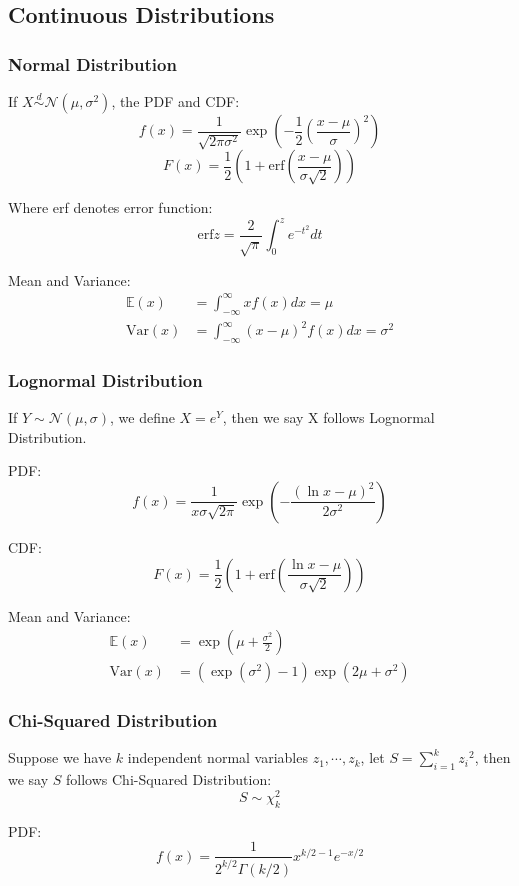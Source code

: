 \subsection{Continuous Distributions}

\subsubsection{Normal Distribution}
If $X \stackrel{d}{\sim} \mathcal{N}(\mu,\sigma^2)$, the PDF and CDF:
\[
f(x) = \frac{1}{\sqrt{2\pi \sigma^2}} \exp(-\frac{1}{2}(\frac{x-\mu}{\sigma})^2)
\]
\[
    F(x) = \frac{1}{2}(1+\mathrm{erf}(\frac{x-\mu}{\sigma \sqrt{2}}))
\]

Where erf denotes error function:
\[
    \mathrm{erf} z= \frac{2}{\sqrt{\pi}}\int_0^z e^{-t^2}dt 
\]

Mean and Variance:
\[
\begin{aligned}
    \mathbb{E}(x) &= \int_{-\infty}^{\infty}xf(x)dx = \mu\\
    \mathrm{Var}(x) &= \int_{-\infty}^{\infty}(x-\mu)^2 f(x)dx = \sigma^2
\end{aligned}    
\]

\subsubsection{Lognormal Distribution}
If $Y \sim \mathcal{N}(\mu,\sigma)$, we define $X = e^Y$, then we say X follows Lognormal Distribution.

PDF:
\[
    f(x) = \frac{1}{x\sigma \sqrt{2\pi}} \exp(-\frac{(\ln x-\mu)^2}{2\sigma^2})
\]

CDF:
\[
    F(x) = \frac{1}{2}(1+\mathrm{erf}(\frac{\ln x-\mu}{\sigma \sqrt{2}}))
\]

Mean and Variance:
\[
\begin{aligned}
    \mathbb{E}(x) &= \exp (\mu + \frac{\sigma^2}{2}) \\
    \mathrm{Var}(x) &= (\exp (\sigma^2)-1)\exp (2\mu + \sigma^2)
\end{aligned}    
\]

\subsubsection{Chi-Squared Distribution}
Suppose we have $k$ independent normal variables $z_1,\cdots,z_k$, let $S = \sum_{i=1}^k {z_i}^2$, then we say $S$ follows Chi-Squared Distribution:
\[
    S \sim \chi_k^2
\]

PDF:
\[
    f(x) = \frac{1}{2^{k/2}\Gamma(k/2)} x^{k/2 -1}e^{-x/2}
\]

